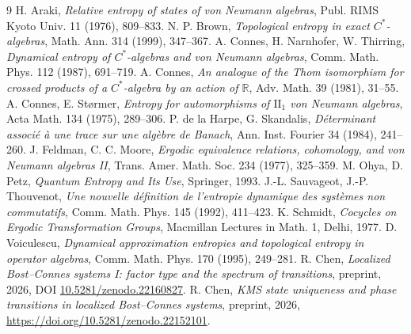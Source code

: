 \documentclass[11pt]{amsart}
\numberwithin{equation}{section}
\theoremstyle{definition}
\theoremstyle{remark}
\newcommand{\R}{\mathbb{R}}
\begin{document}
\begin{thebibliography}{9}
 H. Araki, \emph{Relative entropy of states of von Neumann algebras}, Publ. RIMS Kyoto Univ. 11 (1976), 809--833.
 N. P. Brown, \emph{Topological entropy in exact $C^*$-algebras}, Math. Ann. 314 (1999), 347--367.
 A. Connes, H. Narnhofer, W. Thirring, \emph{Dynamical entropy of $C^*$-algebras and von Neumann algebras}, Comm. Math. Phys. 112 (1987), 691--719.
 A. Connes, \emph{An analogue of the Thom isomorphism for crossed products of a $C^*$-algebra by an action of $\R$}, Adv. Math. 39 (1981), 31--55.
 A. Connes, E. St\o rmer, \emph{Entropy for automorphisms of $\mathrm{II}_1$ von Neumann algebras}, Acta Math. 134 (1975), 289--306.
 P. de la Harpe, G. Skandalis, \emph{D\'eterminant associ\'e \`a une trace sur une alg\`ebre de Banach}, Ann. Inst. Fourier 34 (1984), 241--260.
 J. Feldman, C. C. Moore, \emph{Ergodic equivalence relations, cohomology, and von Neumann algebras II}, Trans. Amer. Math. Soc. 234 (1977), 325--359.
 M. Ohya, D. Petz, \emph{Quantum Entropy and Its Use}, Springer, 1993.
 J.-L. Sauvageot, J.-P. Thouvenot, \emph{Une nouvelle d\'efinition de l'entropie dynamique des syst\`emes non commutatifs}, Comm. Math. Phys. 145 (1992), 411--423.
 K. Schmidt, \emph{Cocycles on Ergodic Transformation Groups}, Macmillan Lectures in Math. 1, Delhi, 1977.
 D. Voiculescu, \emph{Dynamical approximation entropies and topological entropy in operator algebras}, Comm. Math. Phys. 170 (1995), 249--281.
 R. Chen, \emph{Localized Bost--Connes systems I: factor type and the spectrum of transitions}, preprint, 2026, DOI \href{https://doi.org/10.5281/zenodo.22160827}{10.5281/zenodo.22160827}.
 R. Chen, \emph{KMS state uniqueness and phase transitions in localized Bost--Connes systems}, preprint, 2026, \newline\url{https://doi.org/10.5281/zenodo.22152101}.
\end{thebibliography}
\end{document}
